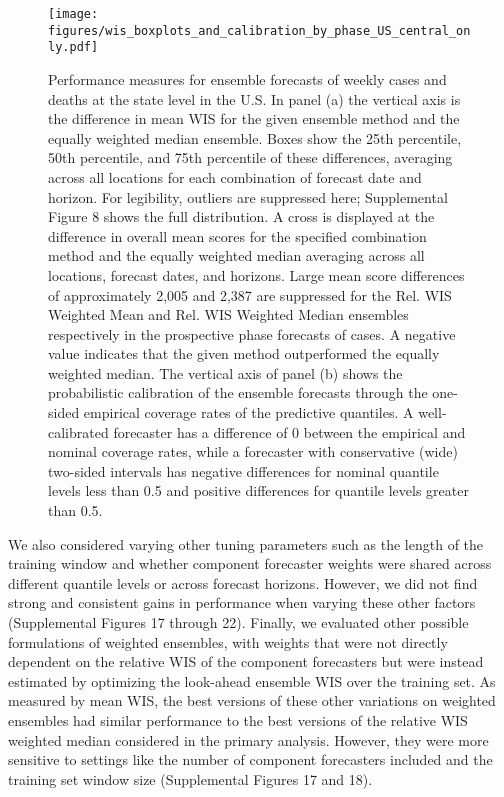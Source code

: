 \documentclass[11pt,3p,authoryear]{elsarticle}
\begin{document}
\begin{figure}
\texttt{[image: figures/wis\_boxplots\_and\_calibration\_by\_phase\_US\_central\_only.pdf]}
\caption{Performance measures for ensemble forecasts of weekly cases and deaths at the state level in the U.S. In panel (a) the vertical axis is the difference in mean WIS for the given ensemble method and the equally weighted median ensemble.
Boxes show the 25th percentile, 50th percentile, and 75th percentile of these differences, averaging across all locations for each combination of forecast date and horizon.
For legibility, outliers are suppressed here; Supplemental Figure 8 shows the full distribution.
A cross is displayed at the difference in overall mean scores for the specified combination method and the equally weighted median averaging across all locations, forecast dates, and horizons.
Large mean score differences of approximately 2,005 and 2,387 are suppressed for the Rel. WIS Weighted Mean and Rel. WIS Weighted Median ensembles respectively in the prospective phase forecasts of cases.
A negative value indicates that the given method outperformed the equally weighted median.
The vertical axis of panel (b) shows the probabilistic calibration of the ensemble forecasts through the one-sided empirical coverage rates of the predictive quantiles.
A well-calibrated forecaster has a difference of 0 between the empirical and nominal coverage rates, while a forecaster with conservative (wide) two-sided intervals has negative differences for nominal quantile levels less than 0.5 and positive differences for quantile levels greater than 0.5.
}
\label{fig:wis_boxplots_and_calibration_by_phase_US_central_only}
\end{figure}

We also considered varying other tuning parameters such as the length of the training window and whether component forecaster weights were shared across different quantile levels or across forecast horizons. However, we did not find strong and consistent gains in performance when varying these other factors (Supplemental Figures 17 through 22). Finally, we evaluated other possible formulations of weighted ensembles, with weights that were not directly dependent on the relative WIS of the component forecasters but were instead estimated by optimizing the look-ahead ensemble WIS over the training set. As measured by mean WIS, the best versions of these other variations on weighted ensembles had similar performance to the best versions of the relative WIS weighted median considered in the primary analysis. However, they were more sensitive to settings like the number of component forecasters included and the training set window size (Supplemental Figures 17 and 18).
\end{document}

